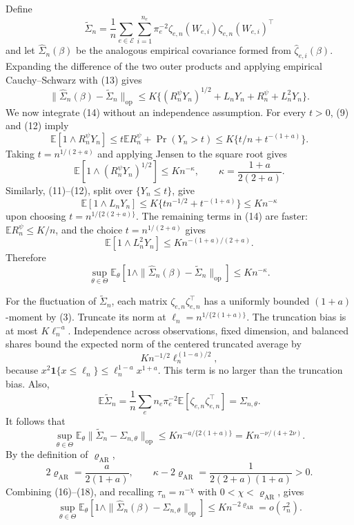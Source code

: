 Define
\[
 \widetilde\Sigma_n=\frac1n\sum_{e\in\mathcal E}\sum_{i=1}^{n_e}\pi_e^{-2}
 \zeta_{e,n}(W_{e,i})\zeta_{e,n}(W_{e,i})^\top
\]
and let \(\widehat\Sigma_n(\beta)\) be the analogous empirical covariance formed from \(\widehat\zeta_{e,i}(\beta)\).  Expanding the difference of the two outer products and applying empirical Cauchy--Schwarz with (13) gives
\[
 \|\widehat\Sigma_n(\beta)-\widetilde\Sigma_n\|_{\mathrm{op}}
 \leq K\{(R_n^\psi Y_n)^{1/2}+L_nY_n
              +R_n^\psi+L_n^2Y_n\}. \tag{14}
\]
We now integrate (14) without an independence assumption.  For every \(t>0\), (9) and (12) imply
\[
 \mathbb E[1\wedge R_n^\psi Y_n]
 \leq t\mathbb ER_n^\psi+\Pr(Y_n>t)
 \leq K\{t/n+t^{-(1+a)}\}.
\]
Taking \(t=n^{1/(2+a)}\) and applying Jensen to the square root gives
\[
 \mathbb E[1\wedge(R_n^\psi Y_n)^{1/2}]
 \leq K n^{-\kappa},
 \qquad
 \kappa=\frac{1+a}{2(2+a)}. \tag{15}
\]
Similarly, (11)--(12), split over \(\{Y_n\leq t\}\), give
\[
 \mathbb E[1\wedge L_nY_n]
 \leq K\{tn^{-1/2}+t^{-(1+a)}\}
 \leq K n^{-\kappa}
\]
upon choosing \(t=n^{1/\{2(2+a)\}}\).  The remaining terms in (14) are faster: \(\mathbb ER_n^\psi\leq K/n\), and the choice \(t=n^{1/(2+a)}\) gives
\[
 \mathbb E[1\wedge L_n^2Y_n]
 \leq K n^{-(1+a)/(2+a)}.
\]
Therefore
\[
 \sup_{\theta\in\Theta}\mathbb E_\theta\!\left[
 1\wedge\|\widehat\Sigma_n(\beta)-\widetilde\Sigma_n\|_{\mathrm{op}}
 \right]
 \leq K n^{-\kappa}. \tag{16}
\]

For the fluctuation of \(\widetilde\Sigma_n\), each matrix
\(\zeta_{e,n}\zeta_{e,n}^\top\) has a uniformly bounded \((1+a)\)-moment by (3).  Truncate its norm at
\(\ell_n=n^{1/\{2(1+a)\}}\).  The truncation bias is at most \(K\ell_n^{-a}\).  Independence across observations, fixed dimension, and balanced shares bound the expected norm of the centered truncated average by
\[
 K n^{-1/2}\ell_n^{(1-a)/2},
\]
because \(x^2\mathbf 1\{x\leq\ell_n\}\leq\ell_n^{1-a}x^{1+a}\).  This term is no larger than the truncation bias.  Also,
\[
 \mathbb E\widetilde\Sigma_n
 =\frac1n\sum_e n_e\pi_e^{-2}
   \mathbb E[\zeta_{e,n}\zeta_{e,n}^\top]
 =\Sigma_{n,\theta}.
\]
It follows that
\[
 \sup_{\theta\in\Theta}\mathbb E_\theta
 \|\widetilde\Sigma_n-\Sigma_{n,\theta}\|_{\mathrm{op}}
 \leq K n^{-a/\{2(1+a)\}}
 =K n^{-\nu/(4+2\nu)}. \tag{17}
\]
By the definition of \(\varrho_{\mathrm{AR}}\),
\[
 2\varrho_{\mathrm{AR}}=\frac{a}{2(1+a)},
 \qquad
 \kappa-2\varrho_{\mathrm{AR}}
 =\frac{1}{2(2+a)(1+a)}>0. \tag{18}
\]
Combining (16)--(18), and recalling \(\tau_n=n^{-\chi}\) with
\(0<\chi<\varrho_{\mathrm{AR}}\), gives
\[
 \sup_{\theta\in\Theta}\mathbb E_\theta\!\left[
 1\wedge\|\widehat\Sigma_n(\beta)-\Sigma_{n,\theta}\|_{\mathrm{op}}
 \right]
 \leq K n^{-2\varrho_{\mathrm{AR}}}=o(\tau_n^2). \tag{19}
\]

